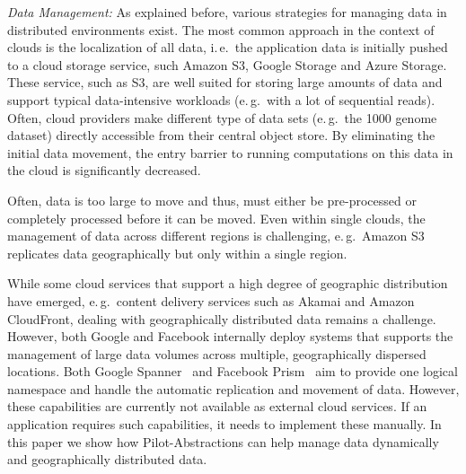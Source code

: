 \documentclass[times]{cpeauth}
\newcommand{\pilot}{Pilot\xspace}
\begin{document}
{\it Data Management:} As explained before, various strategies for
managing data in distributed environments exist. The most common
approach in the context of clouds is the localization of all data,
i.\,e.\ the application data is initially pushed to a cloud storage
service, such Amazon S3, Google Storage and Azure Storage.  These
service, such as S3, are well suited for storing large amounts of data
and support typical data-intensive workloads (e.\,g.\ with a lot of
sequential reads). Often, cloud providers make different type of data
sets (e.\,g.\ the 1000 genome dataset) directly accessible from their
central object store. By eliminating the initial data movement, the
entry barrier to running computations on this data in the cloud is
significantly decreased.

Often, data is too large to move and thus, must either be
pre-processed or completely processed before it can be moved. Even within
single clouds, the management of data across different regions is challenging, 
e.\,g.\ Amazon S3  replicates data geographically but only within a single
region.

While some cloud services that support a high degree of geographic
distribution have emerged, e.\,g.\ content delivery services such as
Akamai and Amazon CloudFront, dealing with geographically distributed
data remains a challenge. However, both Google and Facebook internally
deploy systems that supports the management of large data volumes
across multiple, geographically dispersed locations. Both Google
Spanner~\cite{dean09} and Facebook Prism~\cite{Metz12} aim to provide
one logical namespace and handle the automatic replication and
movement of data. However, these capabilities are currently not
available as external cloud services. If an application requires such
capabilities, it needs to implement these manually.  In this paper we
show how \pilot-Abstractions can help manage data dynamically and
geographically distributed data.
\end{document}
